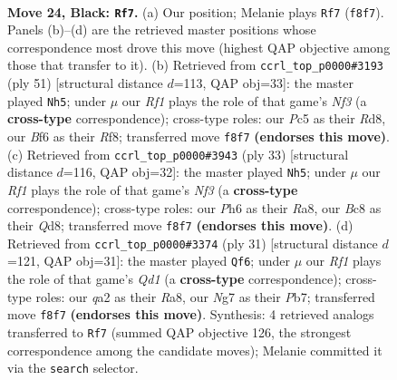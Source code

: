 \documentclass[11pt]{article}
\begin{document}
\clearpage

\begin{figure}[p]\centering
\begin{subfigure}{0.46\textwidth}\centering
\resizebox{\linewidth}{!}{%
\newchessgame
\chessboard[
  setfen={1rbq1r1k/p1n3n1/5bpp/2pp1p2/P4P2/1P3NP1/Q2NP1BP/1RBR2K1 b - - 5 24},
  showmover=false,
  pgfstyle=straightmove, color=movearrow, markmove={f8-f7}
]}
\caption{}
\end{subfigure}\hfill
\begin{subfigure}{0.46\textwidth}\centering
\resizebox{\linewidth}{!}{%
\newchessgame
\chessboard[
  setfen={3r1r2/1b2q2k/pp1b1npp/5p2/n1PN4/4PP2/B3N1PP/2BRQRK1 b - - 7 26},
  showmover=false,
  pgfstyle=straightmove, color=movearrow, markmove={f6-h5}
]}
\caption{}
\end{subfigure}
\\[4pt]
\begin{subfigure}{0.46\textwidth}\centering
\resizebox{\linewidth}{!}{%
\newchessgame
\chessboard[
  setfen={r2qr1k1/2pb1pp1/2pp1n1p/b7/3PP3/P3RN1P/1B1N1PP1/R2Q2K1 b - - 0 17},
  showmover=false,
  pgfstyle=straightmove, color=movearrow, markmove={f6-h5}
]}
\caption{}
\end{subfigure}\hfill
\begin{subfigure}{0.46\textwidth}\centering
\resizebox{\linewidth}{!}{%
\newchessgame
\chessboard[
  setfen={r2qkbr1/1p1b1p1p/p1n1p3/2P5/1Pp2p2/2P2N2/P2N1BPP/R2Q1RK1 b q - 3 16},
  showmover=false,
  pgfstyle=straightmove, color=movearrow, markmove={d8-f6}
]}
\caption{}
\end{subfigure}
\caption{\textbf{Move 24, Black: \texttt{Rf7}.} (a) Our position; Melanie plays \texttt{Rf7} (\texttt{f8f7}). Panels (b)--(d) are the retrieved master positions whose correspondence most drove this move (highest QAP objective among those that transfer to it). (b) Retrieved from \texttt{ccrl\_top\_p0000\#3193} (ply 51) [structural distance $d$=113, QAP obj=33]: the master played \texttt{Nh5}; under $\mu$ our \emph{Rf1} plays the role of that game's \emph{Nf3} (a \textbf{cross-type} correspondence); cross-type roles: our \emph{P}c5 as their \emph{R}d8, our \emph{B}f6 as their \emph{R}f8; transferred move \texttt{f8f7} \textbf{(endorses this move)}. (c) Retrieved from \texttt{ccrl\_top\_p0000\#3943} (ply 33) [structural distance $d$=116, QAP obj=32]: the master played \texttt{Nh5}; under $\mu$ our \emph{Rf1} plays the role of that game's \emph{Nf3} (a \textbf{cross-type} correspondence); cross-type roles: our \emph{P}h6 as their \emph{R}a8, our \emph{B}c8 as their \emph{Q}d8; transferred move \texttt{f8f7} \textbf{(endorses this move)}. (d) Retrieved from \texttt{ccrl\_top\_p0000\#3374} (ply 31) [structural distance $d$=121, QAP obj=31]: the master played \texttt{Qf6}; under $\mu$ our \emph{Rf1} plays the role of that game's \emph{Qd1} (a \textbf{cross-type} correspondence); cross-type roles: our \emph{q}a2 as their \emph{R}a8, our \emph{N}g7 as their \emph{P}b7; transferred move \texttt{f8f7} \textbf{(endorses this move)}. Synthesis: 4 retrieved analogs transferred to \texttt{Rf7} (summed QAP objective 126, the strongest correspondence among the candidate moves); Melanie committed it via the \texttt{search} selector.}

\end{figure}
\end{document}
